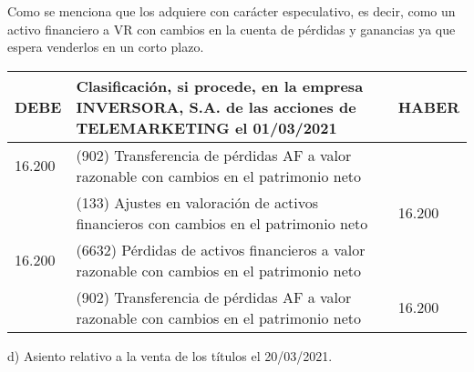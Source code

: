 Como se menciona que los adquiere con carácter especulativo, es decir, como un activo financiero a VR con cambios en la cuenta de pérdidas y ganancias ya que espera venderlos en un corto plazo.

\begin{table}[H]
    \centering
    \begin{tabular}{|p{3cm}|p{6cm}|p{3cm}|}
    \hline
    \rowcolor{blue!30}
    \textbf{DEBE} & \textbf{Clasificación, si procede, en la empresa INVERSORA, S.A. de las acciones de TELEMARKETING el 01/03/2021} & \textbf{HABER} \\
    \hline
    16.200 & (902) Transferencia de pérdidas AF a valor razonable con cambios en el patrimonio neto & \\
    \hline
    & (133) Ajustes en valoración de activos financieros con cambios en el patrimonio neto & 16.200 \\
    \hline
    16.200 & (6632) Pérdidas de activos financieros a valor razonable con cambios en el patrimonio neto & \\
    \hline
    & (902) Transferencia de pérdidas AF a valor razonable con cambios en el patrimonio neto & 16.200 \\
    \hline
    \end{tabular}
\end{table}

d) Asiento relativo a la venta de los títulos el 20/03/2021.




